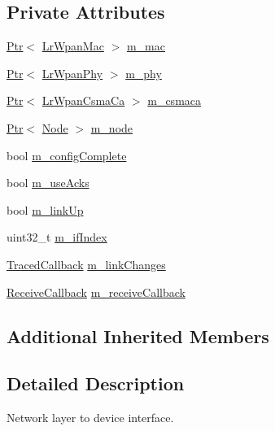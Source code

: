 \subsection*{Private Attributes}
\begin{DoxyCompactItemize}
\item 
\hyperlink{classns3_1_1Ptr}{Ptr}$<$ \hyperlink{classns3_1_1LrWpanMac}{Lr\+Wpan\+Mac} $>$ \hyperlink{classns3_1_1LrWpanNetDevice_a2592ad53fd745035dfdd50ffeb4e4259}{m\+\_\+mac}
\item 
\hyperlink{classns3_1_1Ptr}{Ptr}$<$ \hyperlink{classns3_1_1LrWpanPhy}{Lr\+Wpan\+Phy} $>$ \hyperlink{classns3_1_1LrWpanNetDevice_a78e6e248b53fe535e3a02c58615522a6}{m\+\_\+phy}
\item 
\hyperlink{classns3_1_1Ptr}{Ptr}$<$ \hyperlink{classns3_1_1LrWpanCsmaCa}{Lr\+Wpan\+Csma\+Ca} $>$ \hyperlink{classns3_1_1LrWpanNetDevice_adf20b42f2fc813649c641cdd3d90e046}{m\+\_\+csmaca}
\item 
\hyperlink{classns3_1_1Ptr}{Ptr}$<$ \hyperlink{classns3_1_1Node}{Node} $>$ \hyperlink{classns3_1_1LrWpanNetDevice_a519ec8c18dffe783cbd0d8a8dbf31e99}{m\+\_\+node}
\item 
bool \hyperlink{classns3_1_1LrWpanNetDevice_ac13281dadc488033dcdef806c30c76b9}{m\+\_\+config\+Complete}
\item 
bool \hyperlink{classns3_1_1LrWpanNetDevice_a2e9f71d0b393e1d0030869b2bd7b2ab8}{m\+\_\+use\+Acks}
\item 
bool \hyperlink{classns3_1_1LrWpanNetDevice_a67d9d8e2d43301ff6b8b0001488613ea}{m\+\_\+link\+Up}
\item 
uint32\+\_\+t \hyperlink{classns3_1_1LrWpanNetDevice_aff87fd6bdcb758c002c4bc05497f3fcd}{m\+\_\+if\+Index}
\item 
\hyperlink{classns3_1_1TracedCallback}{Traced\+Callback} \hyperlink{classns3_1_1LrWpanNetDevice_adfd54c10aeb7b1f878242a2eda1ca813}{m\+\_\+link\+Changes}
\item 
\hyperlink{classns3_1_1NetDevice_ad5e5e1ca187472bc2ba99575d8def568}{Receive\+Callback} \hyperlink{classns3_1_1LrWpanNetDevice_a6233bbfe4654d619c87ab406f05a39fe}{m\+\_\+receive\+Callback}
\end{DoxyCompactItemize}
\subsection*{Additional Inherited Members}


\subsection{Detailed Description}
Network layer to device interface. 

